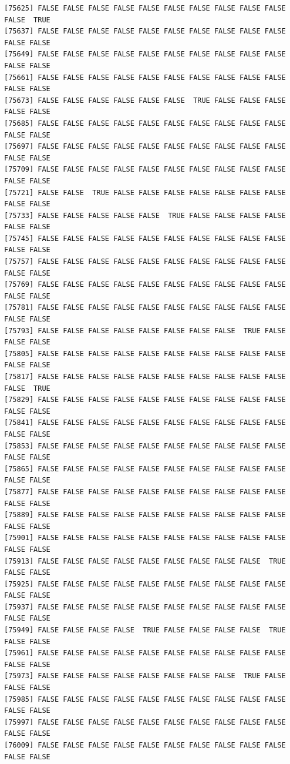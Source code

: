 \documentclass[
  a4paper,
  DIV=11,
  numbers=noendperiod]{scrartcl}
\begin{document}
\begin{verbatim}
[75625] FALSE FALSE FALSE FALSE FALSE FALSE FALSE FALSE FALSE FALSE FALSE  TRUE
[75637] FALSE FALSE FALSE FALSE FALSE FALSE FALSE FALSE FALSE FALSE FALSE FALSE
[75649] FALSE FALSE FALSE FALSE FALSE FALSE FALSE FALSE FALSE FALSE FALSE FALSE
[75661] FALSE FALSE FALSE FALSE FALSE FALSE FALSE FALSE FALSE FALSE FALSE FALSE
[75673] FALSE FALSE FALSE FALSE FALSE FALSE  TRUE FALSE FALSE FALSE FALSE FALSE
[75685] FALSE FALSE FALSE FALSE FALSE FALSE FALSE FALSE FALSE FALSE FALSE FALSE
[75697] FALSE FALSE FALSE FALSE FALSE FALSE FALSE FALSE FALSE FALSE FALSE FALSE
[75709] FALSE FALSE FALSE FALSE FALSE FALSE FALSE FALSE FALSE FALSE FALSE FALSE
[75721] FALSE FALSE  TRUE FALSE FALSE FALSE FALSE FALSE FALSE FALSE FALSE FALSE
[75733] FALSE FALSE FALSE FALSE FALSE  TRUE FALSE FALSE FALSE FALSE FALSE FALSE
[75745] FALSE FALSE FALSE FALSE FALSE FALSE FALSE FALSE FALSE FALSE FALSE FALSE
[75757] FALSE FALSE FALSE FALSE FALSE FALSE FALSE FALSE FALSE FALSE FALSE FALSE
[75769] FALSE FALSE FALSE FALSE FALSE FALSE FALSE FALSE FALSE FALSE FALSE FALSE
[75781] FALSE FALSE FALSE FALSE FALSE FALSE FALSE FALSE FALSE FALSE FALSE FALSE
[75793] FALSE FALSE FALSE FALSE FALSE FALSE FALSE FALSE  TRUE FALSE FALSE FALSE
[75805] FALSE FALSE FALSE FALSE FALSE FALSE FALSE FALSE FALSE FALSE FALSE FALSE
[75817] FALSE FALSE FALSE FALSE FALSE FALSE FALSE FALSE FALSE FALSE FALSE  TRUE
[75829] FALSE FALSE FALSE FALSE FALSE FALSE FALSE FALSE FALSE FALSE FALSE FALSE
[75841] FALSE FALSE FALSE FALSE FALSE FALSE FALSE FALSE FALSE FALSE FALSE FALSE
[75853] FALSE FALSE FALSE FALSE FALSE FALSE FALSE FALSE FALSE FALSE FALSE FALSE
[75865] FALSE FALSE FALSE FALSE FALSE FALSE FALSE FALSE FALSE FALSE FALSE FALSE
[75877] FALSE FALSE FALSE FALSE FALSE FALSE FALSE FALSE FALSE FALSE FALSE FALSE
[75889] FALSE FALSE FALSE FALSE FALSE FALSE FALSE FALSE FALSE FALSE FALSE FALSE
[75901] FALSE FALSE FALSE FALSE FALSE FALSE FALSE FALSE FALSE FALSE FALSE FALSE
[75913] FALSE FALSE FALSE FALSE FALSE FALSE FALSE FALSE FALSE  TRUE FALSE FALSE
[75925] FALSE FALSE FALSE FALSE FALSE FALSE FALSE FALSE FALSE FALSE FALSE FALSE
[75937] FALSE FALSE FALSE FALSE FALSE FALSE FALSE FALSE FALSE FALSE FALSE FALSE
[75949] FALSE FALSE FALSE FALSE  TRUE FALSE FALSE FALSE FALSE  TRUE FALSE FALSE
[75961] FALSE FALSE FALSE FALSE FALSE FALSE FALSE FALSE FALSE FALSE FALSE FALSE
[75973] FALSE FALSE FALSE FALSE FALSE FALSE FALSE FALSE  TRUE FALSE FALSE FALSE
[75985] FALSE FALSE FALSE FALSE FALSE FALSE FALSE FALSE FALSE FALSE FALSE FALSE
[75997] FALSE FALSE FALSE FALSE FALSE FALSE FALSE FALSE FALSE FALSE FALSE FALSE
[76009] FALSE FALSE FALSE FALSE FALSE FALSE FALSE FALSE FALSE FALSE FALSE FALSE

\end{verbatim}
\end{document}
